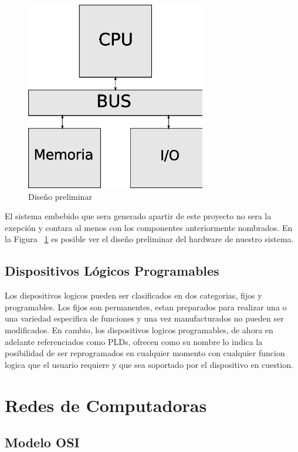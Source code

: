 \begin{figure}[h]
  \centering
	\includegraphics[width=0.70\textwidth]{2-sistema/graf/general.eps}
  \caption{Diseño preliminar}
  \label{fig:diseno}
\end{figure}

El sistema embebido que sera generado apartir de este proyecto no sera la exepción y contara al menos con los componentes anteriormente nombrados. En la Figura ~\ref{fig:diseno} es posible ver el diseño preliminar del hardware de nuestro sistema.




\subsection{Dispositivos Lógicos Programables}
Los dispositivos logicos pueden ser clasificados en dos categorias, fijos y programables. Los fijos son permanentes, estan preparados para realizar una o una variedad especifica de funciones y una vez manufacturados no pueden ser modificados.
En cambio, los dispositivos logicos programables, de ahora en adelante referenciados como PLDs, ofrecen como su nombre lo indica la posibilidad de ser reprogramados en cualquier momento con cualquier funcion logica que el usuario requiere y que sea soportado por el dispositivo en cuestion.	

\section{Redes de Computadoras}

\subsection{Modelo OSI}

